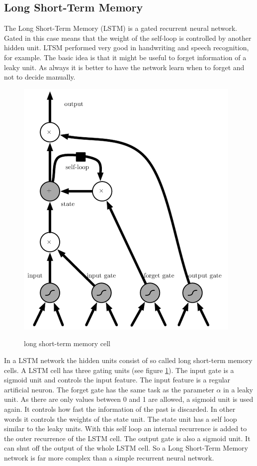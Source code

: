 \subsection{Long Short-Term Memory}
\label{sec:lstm}
The Long Short-Term Memory (LSTM) is a gated recurrent neural network. Gated in this case means that the weight of the self-loop is controlled by another hidden unit. LTSM performed very good in handwriting and speech recognition, for example. The basic idea is that it might be useful to forget information of a leaky unit. As always it is better to have the network learn when to forget and not to decide manually.\\
\begin{figure}[thb]
	\caption{long short-term memory cell \cite[p. 405]{DeepLearning}}
	\includegraphics[width=0.95\linewidth]{images/lstmCell.PNG}
	\label{fig:lstm}
\end{figure}
In a LSTM network the hidden units consist of so called long short-term memory cells. A LSTM cell has three gating units (see figure \ref{fig:lstm}). The input gate is a sigmoid unit and controls the input feature. The input feature is a regular artificial neuron. The forget gate has the same task as the parameter $\alpha$ in a leaky unit. As there are only values between 0 and 1 are allowed, a sigmoid unit is used again. It controls how fast the information of the past is discarded. In other words it controls the weights of the state unit. The state unit has a self loop similar to the leaky units. With this self loop an internal recurrence is added to the outer recurrence of the LSTM cell. The output gate is also a sigmoid unit. It can shut off the output of the whole LSTM cell. So a Long Short-Term Memory network is far more complex than a simple recurrent neural network.
